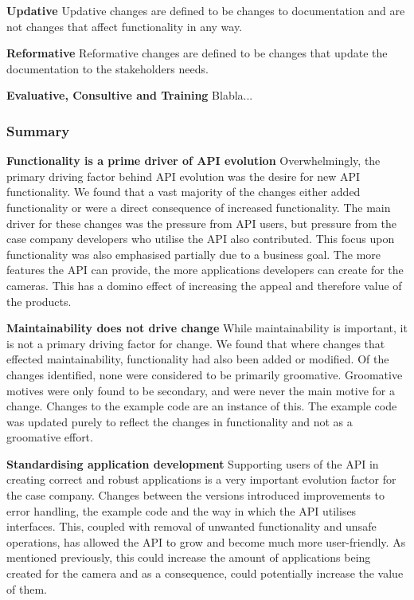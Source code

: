 \documentclass{sig-alternate}
\begin{document}
\smallskip \noindent
\textbf{Updative  }
Updative changes are defined to be changes to documentation and are not changes that affect functionality in any way.

\smallskip \noindent
\textbf{Reformative  }
Reformative changes are defined to be changes that update the documentation to the stakeholders needs.

\smallskip \noindent
\textbf{Evaluative, Consultive and Training  }
Blabla...

\subsubsection{Summary}


\noindent
\textbf{Functionality is a prime driver of API evolution  }  %
Overwhelmingly, the primary driving factor behind API evolution was the desire for new API functionality. We found that a vast majority of the changes either added functionality or were a direct consequence of increased functionality. The main driver for these changes was the pressure from API users, but pressure from the case company developers who utilise the API also contributed. This focus upon functionality was also emphasised partially due to a business goal. The more features the API can provide, the more applications developers can create for the cameras. This has a domino effect of increasing the appeal and therefore value of the products.

\smallskip \noindent 
\textbf{Maintainability does not drive change  }  %
While maintainability is important, it is not a primary driving factor for change. We found that where changes that effected maintainability, functionality had also been added or modified. Of the changes identified, none were considered to be primarily groomative. Groomative motives were only found to be secondary, and were never the main motive for a change. Changes to the example code are an instance of this. The example code was updated purely to reflect the changes in functionality and not as a groomative effort. 

\smallskip \noindent
\textbf{Standardising application development  } %
Supporting users of the API in creating correct and robust applications is a very important evolution factor for the case company. Changes between the versions introduced improvements to error handling, the example code and the way in which the API utilises interfaces. This, coupled with removal of unwanted functionality and unsafe operations, has allowed the API to grow and become much more user-friendly. As mentioned previously, this could increase the amount of applications being created for the camera and as a consequence, could potentially increase the value of them.
\end{document}
